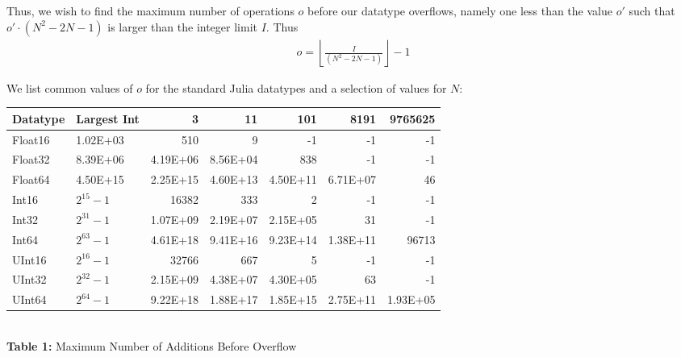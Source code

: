 Thus, we wish to find the maximum number of operations $o$ before our datatype overflows, namely one less than the value $o'$ such that $o' \cdot (N^2 - 2N - 1)$ is larger than the integer limit $I$. Thus
\begin{align*}
    o = \left\lfloor \frac{I}{(N^2 - 2N - 1)} \right\rfloor - 1
\end{align*}

We list common values of $o$ for the standard Julia datatypes and a selection of values for $N$:

\begin{center}
\begin{tabular}{llrrrrr}
\hline
\textbf{Datatype} & \multicolumn{1}{l}{\textbf{Largest Int}} & \textbf{3} & \textbf{11} & \textbf{101} & \textbf{8191} & \textbf{9765625} \\ \hline
Float16           & 1.02E+03                                     & 510        & 9           & -1           & -1            & -1               \\
Float32           & 8.39E+06                                     & 4.19E+06   & 8.56E+04    & 838          & -1            & -1               \\
Float64           & 4.50E+15                                     & 2.25E+15   & 4.60E+13    & 4.50E+11     & 6.71E+07      & 46               \\
Int16             & $2^{15}-1$                                     & 16382      & 333         & 2            & -1            & -1               \\
Int32             & $2^{31}-1$                                     & 1.07E+09   & 2.19E+07    & 2.15E+05     & 31            & -1               \\
Int64             & $2^{63}-1$                                     & 4.61E+18   & 9.41E+16    & 9.23E+14     & 1.38E+11      & 96713            \\
UInt16            & $2^16-1$                                     & 32766      & 667         & 5            & -1            & -1               \\
UInt32            & $2^{32}-1$                                     & 2.15E+09   & 4.38E+07    & 4.30E+05     & 63            & -1               \\
UInt64            & $2^{64}-1$                                     & 9.22E+18   & 1.88E+17    & 1.85E+15     & 2.75E+11      & 1.93E+05         \\ \hline
\end{tabular} \bigskip\\
\textbf{Table 1:} Maximum Number of Additions Before Overflow
\end{center}
%

